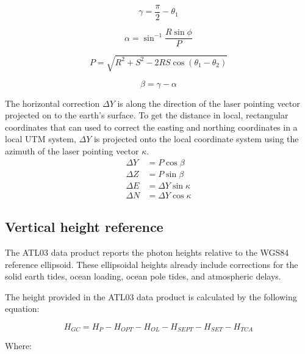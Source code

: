 \begin{equation}
      \gamma = \frac{\pi}{2} - \theta_1
\end{equation}

\begin{equation}
      \alpha = \sin^{-1}{\frac{R \sin{\phi}}{P}}
\end{equation}

\begin{equation}
      P = \sqrt{R^2 + S^2 - 2RS \cos{(\theta_1 - \theta_2)}}
\end{equation}

\begin{equation}
      \beta = \gamma - \alpha
\end{equation}

The horizontal correction $\Delta Y$ is along the direction of the laser pointing vector projected on to the earth's surface. To get the distance in local, rectangular coordinates that can used to correct the easting and northing coordinates in a local UTM system, $\Delta Y$ is projected onto the local coordinate system using the azimuth of the laser pointing vector $\kappa$.
\begin{align}
      \Delta Y & = P \cos{\beta}         \\
      \Delta Z & = P \sin{\beta}         \\
      \Delta E & = \Delta Y \sin{\kappa} \\
      \Delta N & = \Delta Y \cos{\kappa}
\end{align}

\subsection{Vertical height reference}

The ATL03 data product reports the photon heights relative to the WGS84 reference ellipsoid. These ellipsoidal heights already include corrections for the solid earth tides, ocean loading, ocean pole tides, and atmospheric delays.

The height provided in the ATL03 data product is calculated by the following equation:

\[H_{GC} =  H_{P} - H_{OPT} - H_{OL} - H_{SEPT} - H_{SET} - H_{TCA}\]

Where:

